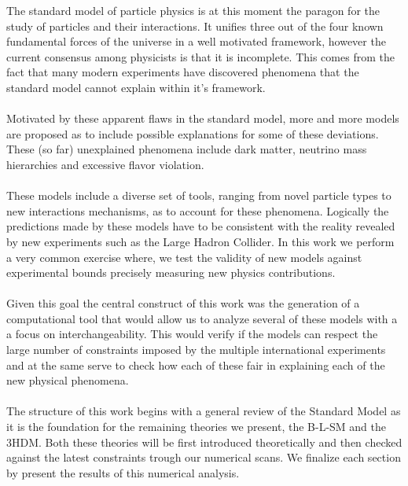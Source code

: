 \documentclass[10pt]{report}
\renewcommand{\(}{\left(}
\renewcommand{\)}{\right)}
\renewcommand{\[}{\left[}
\renewcommand{\]}{\right]}
\begin{document}
\TitlePage
  \vspace*{55mm}
       {%
       The standard model of particle physics is at this moment the paragon for the study of particles and their interactions. It unifies three out of the four known fundamental forces of the universe in a well motivated framework, however the current consensus among physicists is that it is incomplete. This comes from the fact that many modern experiments have discovered phenomena that the standard model cannot explain within it's framework. 
       \\ \ \\ 
       Motivated by these apparent flaws in the standard model, more and more models are proposed as to include possible explanations for some of these deviations. These (so far) unexplained phenomena include dark matter, neutrino mass hierarchies and excessive flavor violation.
       \\ \ \\ 
       These models include a diverse set of tools, ranging from novel particle types to new interactions mechanisms, as to account for these phenomena. Logically the predictions made by these models have to be consistent with the reality revealed by new experiments such as the Large Hadron Collider. In this work we perform a very common exercise where, we test the validity of new models against experimental bounds precisely measuring new physics contributions.  
       \\ \ \\ 
       Given this goal the central construct of this work was the generation of a computational tool that would allow us to analyze several of these models with a a focus on interchangeability. This would verify if the models can respect the large number of constraints imposed by the multiple international experiments and at the same serve to check how each of these fair in explaining each of the new physical phenomena. 
       \\ \ \\ 
       The structure of this work begins with a general review of the Standard Model as it is the foundation for the remaining theories we present, the B-L-SM and the 3HDM. Both these theories will be first introduced theoretically and then checked against the latest constraints trough our numerical scans. We finalize each section by present the results of this numerical analysis. 
       }
\EndTitlePage
\titlepage\ \endtitlepage %


\tableofcontents
\end{document}
